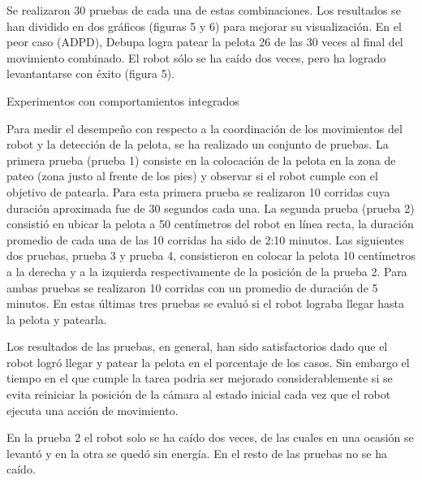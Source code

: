 Se realizaron 30 pruebas de cada una de estas combinaciones. Los resultados se han dividido en dos gr\'aficos (figuras 5 y 6) para mejorar su visualizaci\'on.  En el peor caso (ADPD),  Debupa logra patear la pelota 26 de las 30 veces al final del movimiento combinado. El robot s\'olo se ha ca\'ido dos veces, pero ha logrado levantantarse con \'exito (figura 5).

Experimentos con comportamientos integrados 

Para medir el desempeño con respecto a la coordinación de los movimientos del robot y la detección de la pelota, se ha realizado un conjunto de pruebas. La primera prueba (prueba 1) consiste en la colocación de la pelota en la zona de pateo (zona justo al frente de los pies) y observar si el robot cumple con el objetivo de patearla. Para esta primera prueba se realizaron 10 corridas cuya duración aproximada fue de 30 segundos cada una. La segunda prueba (prueba 2) consistió en ubicar la pelota a 50 centímetros del robot en línea recta, la duración promedio de cada una de las 10 corridas ha sido de 2:10 minutos. Las siguientes dos pruebas, prueba 3 y prueba 4, consistieron en colocar la pelota 10 centímetros a la derecha y a la izquierda respectivamente de la posición de la prueba 2. Para ambas pruebas se realizaron 10 corridas con un promedio de duración de 5 minutos. En estas últimas tres pruebas se evaluó si el robot lograba llegar hasta la pelota y patearla. 

Los resultados de las pruebas, en general, han sido satisfactorios dado que el robot logró llegar y patear la pelota en el porcentaje de los casos. Sin embargo el tiempo en el que cumple la tarea podria ser mejorado considerablemente si se evita reiniciar la posición de la cámara al estado inicial cada vez que el robot ejecuta una acción de movimiento.  

En la prueba 2 el robot solo se ha caído dos veces, de las cuales en una ocasión se levantó y en la otra se quedó sin energía. En el resto de las pruebas no se ha caído.  


